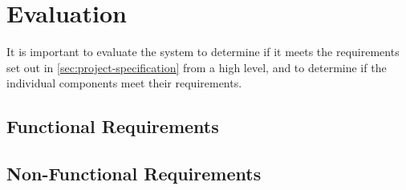 \section{Evaluation}
\label{sec:evaluation}
It is important to evaluate the system to determine if it meets the requirements set out in \autoref{sec:project-specification} from a high level, and to determine if the individual components meet their requirements. 

\subsection{Functional Requirements}


\subsection{Non-Functional Requirements}